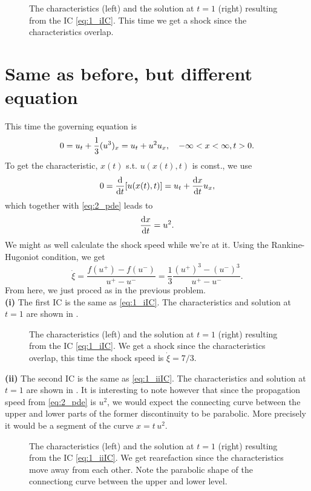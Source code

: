 \documentclass[11pt,letter, swedish, english
]{article}
\begin{document}
\begin{figure}
\centering
\resizebox{!}{3.6cm}{}
\caption{The characteristics (left) and the solution at $t=1$ (right)
  resulting from the IC \eqref{eq:1_iIC}. This time we get a shock
  since the characteristics overlap. } 
\label{fig:1ii}
\end{figure}



\section{Same as before, but different equation}
This time the governing equation is
\begin{equation}\label{eq:2_pde}
0 = u_t + \frac{1}{3} (u^3)_x = u_t + u^2u_x\qcomma
-\infty<x<\infty, t>0.
\end{equation}
To get the characteristic, $x(t)$ s.t. $u(x(t), t)$ is const., we use
\begin{equation}
0 = \dv{t} \qty[u(x(t), t)] = u_t + \dv{x}{t}u_x,
\end{equation}
which together with \eqref{eq:2_pde} leads to
\begin{equation}
\dv{x}{t} = u^2.
\end{equation}
We might as well calculate the shock speed while we're at it. Using
the Rankine-Hugoniot condition, we get
\begin{equation}
\dot\xi = \frac{f(u^+) - f(u^-) }{u^+ - u^-} 
= \frac{1}{3}\frac{(u^+)^3 - (u^-)^3}{u^+ - u^-}.
\end{equation}
From here, we just proced as in the previous problem.
\\[11pt]
\noindent
\textbf{(i) }
The first IC is the same as \eqref{eq:1_iIC}.
The characteristics and solution at $t=1$ are shown in .

\begin{figure}
\centering
\resizebox{!}{3.6cm}{}
\caption{The characteristics (left) and the solution at $t=1$ (right)
  resulting from the IC \eqref{eq:1_iIC}. We get a shock
  since the characteristics overlap, this time the shock speed is
  $\dot\xi=7/3$. } 
\label{fig:2i}
\end{figure}

\noindent
\textbf{(ii) }
The second IC is the same as \eqref{eq:1_iiIC}.
The characteristics and solution at $t=1$ are shown in
. It is interesting to note however that since the
propagation speed from \eqref{eq:2_pde} is $u^2$, we would expect the
connecting curve between the upper and lower parts of the former
discontinuity to be parabolic. More precisely it would be a segment of
the curve $x= t\,u^2$.
\begin{figure}
\centering
\resizebox{!}{3.6cm}{}
\caption{The characteristics (left) and the solution at $t=1$ (right) 
  resulting from the IC \eqref{eq:1_iiIC}. We get rearefaction since
  the characteristics move away from each other. Note the parabolic
  shape of the connectiong curve between the upper and lower level.} 
\label{fig:2ii}
\end{figure}
\end{document}
